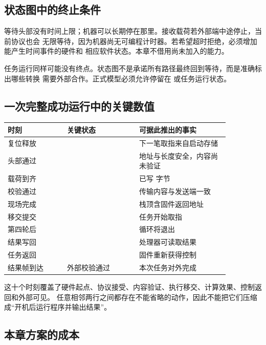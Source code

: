 \subsection{状态图中的终止条件}

等待头部没有时间上限；机器可以长期停在那里。接收载荷若外部端中途停止，当前协议也会
无限等待，因为机器尚无可编程计时器。若希望超时拒绝，必须增加能产生时间事件的硬件和
相应软件状态。本章不借用尚未加入的能力。

任务运行同样可能没有终点。状态图不是承诺所有路径最终回到等待，而是准确标出哪些转换
需要外部合作。正式模型必须允许停留在  或任务运行状态。

\subsection{一次完整成功运行中的关键数值}

\begin{longtable}{|L{0.23\linewidth}|L{0.28\linewidth}|L{0.35\linewidth}|}
\hline
{}
时刻 & 关键状态 & 可据此推出的事实 \\ \hline
复位释放 &  & 下一笔取指来自启动存储 \\ \hline
头部通过 &  & 地址与长度安全，内容尚未验证 \\ \hline
载荷到齐 &  & 已写  字节 \\ \hline
校验通过 &  & 传输内容与发送端一致 \\ \hline
现场完成 &  & 栈顶含固件返回地址 \\ \hline
移交提交 &  & 任务开始取指 \\ \hline
第四轮后 &  & 循环将退出 \\ \hline
结果写回 &  & 处理器可读取结果 \\ \hline
任务返回 &  & 固件重新获得控制 \\ \hline
结果帧到达 & 外部校验通过 & 本次任务对外完成 \\ \hline
\end{longtable}

这十个时刻覆盖了硬件起点、协议接受、内容验证、执行移交、计算效果、控制返回和外部可见。
任意相邻两行之间都存在不能省略的动作，因此不能把它们压缩成“开机后运行程序并输出结果”。

\subsection{本章方案的成本}

